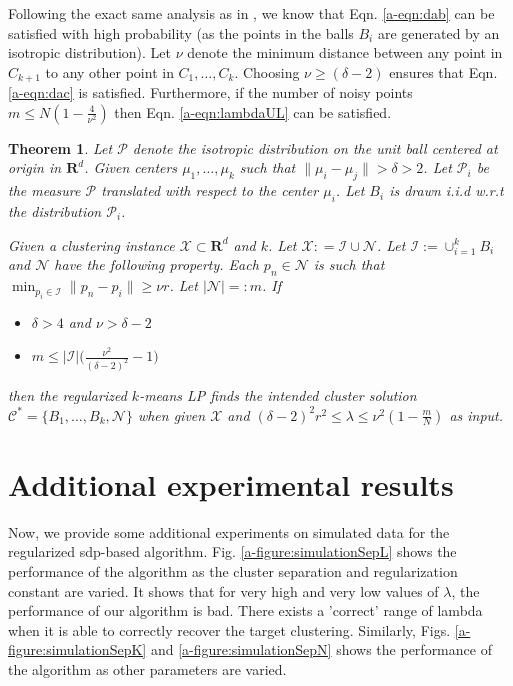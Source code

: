 \documentclass[12pt]{article}
\newcommand{\mc}{\mathcal}
\newcommand{\mb}{\mathbf}
\newtheorem{theorem}{Theorem}
\begin{document}
Following the exact same analysis as in \cite{awasthi2015relax}, we know that Eqn. \ref{a-eqn:dab} can be satisfied with high probability (as the points in the balls $B_i$ are generated by an isotropic distribution).   Let $\nu$ denote the minimum distance between any point in $C_{k+1}$ to any other point in $C_1, \ldots, C_k$. Choosing $\nu \ge (\delta-2)$ ensures that Eqn. \ref{a-eqn:dac} is satisfied. Furthermore, if the number of noisy points $m \le N (1-\frac{4}{\nu^2})$ then Eqn. \ref{a-eqn:lambdaUL} can be satisfied.

\begin{theorem}
\label{a-theorem:lptight}
Let $\mc P$ denote the isotropic distribution on the unit ball centered at origin in $\mb R^d$. Given centers $\mu_1, \ldots, \mu_k$ such that $\|\mu_i - \mu_j\| > \delta > 2$. Let $\mc P_i$ be the measure $\mc P$ translated with respect to the center $\mu_i$. Let $B_i$ is drawn i.i.d w.r.t the distribution $\mc P_i$. 

Given a clustering instance $\mc X \subset \mb R^d$ and $k$. Let $\mc X : = \mc I \cup \mc N$. Let $\mc I := \cup_{i=1}^k B_i$ and $\mc N$ have the following property. Each $p_n \in \mc N$ is such that $\min_{p_i \in \mc I} \|p_n - p_i\| \ge \nu r$. Let $|\mc N| =: m$. If

\begin{itemize}
  \item $\delta > 4$ and $\nu > \delta - 2$ 
  \item $m \le |\mc I|\Big(\frac{\nu^2}{(\delta-2)^2}-1\Big)$
\end{itemize}
then the regularized $k$-means LP finds the intended cluster solution  $\mc C^* = \{B_1, \ldots, B_k, \mc N\}$ when given $\mc X$ and $(\delta - 2)^2r^2 \le \lambda \le \nu^2(1-\frac{m}{N})$ as input.
\end{theorem}

\section{Additional experimental results}
Now, we provide some additional experiments on simulated data for the regularized sdp-based algorithm. Fig. \ref{a-figure:simulationSepL} shows the performance of the algorithm as the cluster separation and regularization constant are varied. It shows that for very high and very low values of $\lambda$, the performance of our algorithm is bad. There exists a 'correct' range of lambda when it is able to correctly recover the target clustering. Similarly, Figs. \ref{a-figure:simulationSepK} and \ref{a-figure:simulationSepN} shows the performance of the algorithm as other parameters are varied.
\end{document}
